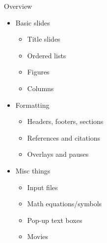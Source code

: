 \documentclass[11pt,mathserif]{beamer} %
\begin{document}
\begin{frame}[t]{Overview} %
	\begin{itemize} %
		\item Basic slides %
		\begin{itemize} %
			\item Title slides %
			\item Ordered lists
			\item Figures
			\item Columns
		\end{itemize} %
\vspace{0.1in} %
		\item Formatting %
		\begin{itemize} %
			\item Headers, footers, sections
			\item References and citations
			\item Overlays and pauses
		\end{itemize}
\vspace{0.1in}
		\item Misc things
		\begin{itemize}
			\item Input files
			\item Math equations/symbols
			\item Pop-up text boxes
			\item Movies
		\end{itemize}
	\end{itemize}
\end{frame}
\end{document}
